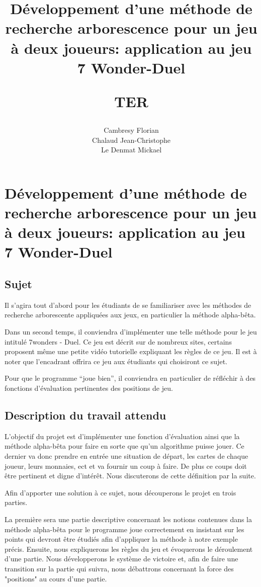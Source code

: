 \documentclass[a4paper, 12pt, french]{article}
\title{
	\Huge
	\textbf{Développement d'une méthode de recherche arborescence pour un jeu à deux joueurs:
		application au jeu 7 Wonder-Duel}
	\vspace{0.4cm}

	\LARGE
	TER
}
\author{
	Cambresy Florian \\
	Chalaud Jean-Christophe \\
	Le Denmat Mickael
}
\begin{document}
	

	\newpage
	\renewcommand{\contentsname}{Table des matières}
	\tableofcontents

	\newpage
	\section{Développement d'une méthode de recherche arborescence pour un jeu à deux joueurs:
	application au jeu 7 Wonder-Duel}
	\subsection{Sujet}
	Il s’agira tout d’abord pour les étudiants de se familiariser avec les méthodes de recherche arborescente
	appliquées aux jeux, en particulier la méthode alpha-bêta.

	Dans un second temps, il conviendra d'implémenter une telle méthode pour le jeu intitulé 7wonders - Duel.
	Ce jeu est décrit sur de nombreux sites, certains proposent même une petite vidéo tutorielle expliquant
	les règles de ce jeu. Il est à noter que l’encadrant offrira ce jeu aux étudiants qui
	choisiront ce sujet.

	Pour que le programme “joue bien”, il conviendra en particulier de réfléchir à des fonctions d'évaluation
	pertinentes des positions de jeu.

	\subsection{Description du travail attendu}
	L'objectif du projet est d'implémenter une fonction d'évaluation ainsi que la méthode alpha-bêta pour
	faire en sorte que qu'un algorithme puisse jouer. Ce dernier va donc prendre en entrée une situation de départ,
	les cartes de chaque joueur, leurs monnaies, ect et va fournir un coup à faire. De plus ce coups doit
	être pertinent et digne d'intérêt. Nous discuterons de cette définition par la suite.

	Afin d'apporter une solution à ce sujet, nous découperons le projet en trois parties.

	La première sera une partie descriptive concernant les notions contenues dans la méthode alpha-bêta pour
	le programme joue correctement en insistant sur les points qui devront être étudiés afin d'appliquer la méthode
	à notre exemple précis. Ensuite, nous expliquerons les règles du jeu et évoquerons le déroulement d'une partie.
	Nous développerons le système de victoire et, afin de faire une transition sur la partie qui suivra, nous
	débattrons concernant la force des "positions" au cours d'une partie.
\end{document}
